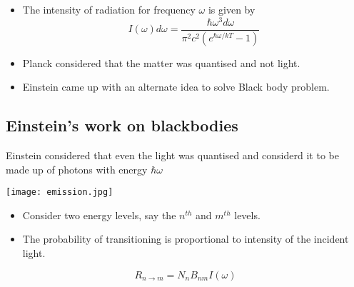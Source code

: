 \documentclass[aspectratio=169]{beamer}
\begin{document}
\begin{frame}{}

	\begin{itemize}

		\item The intensity of radiation for frequency $\omega$ is given by \[I(\omega)d\omega = \frac{\hbar \omega^3 d\omega}{ \pi^2 c^2 \left(e^{\hbar \omega / kT}-1 \right) } \] \pause \newline
		\item Planck considered that the matter was quantised and not light. \pause \newline
		\item Einstein came up with an alternate idea to solve Black body problem.
		 
	\end{itemize}
	
\end{frame}


\subsection{Einstein's work on blackbodies}

\begin{frame}{}

	\begin{center}

		{\large Einstein considered that even the light was quantised and considerd it to be made up of photons with energy $\hbar \omega$  }  
			
	
	 		\texttt{[image: emission.jpg]}
	 
		\end{center}

	
\end{frame}

\begin{frame}

	\begin{itemize}
	
		\item Consider two energy levels, say the $n^{th}$ and $m^{th}$ levels. \pause \newline
		\item The probability of transitioning is proportional to intensity of the incident light. \pause \newline
		
	\end{itemize}
		
			\begin{equation}
					 R_{n \to m} = N_{n} B_{nm} I(\omega) 	 
			\end{equation} 
						
\end{frame}
\end{document}
